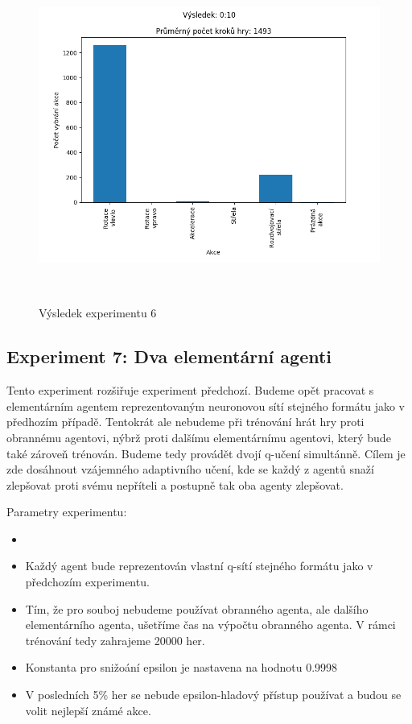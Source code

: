 \begin{figure}[p]\centering
\includegraphics[width=145mm, height=110mm]{./Obrazky/Experiment06Results.png}
\caption{Výsledek experimentu 6}
\label{Výsledek experimentu 06}
\end{figure}
    



\subsection{Experiment 7: Dva elementární agenti}
Tento experiment rozšiřuje experiment předchozí. Budeme opět pracovat s elementárním agentem reprezentovaným neuronovou sítí stejného formátu jako v předhozím případě.
Tentokrát ale nebudeme při trénování hrát hry proti obrannému agentovi, nýbrž proti dalšímu elementárnímu agentovi, který bude také zároveň trénován.
Budeme tedy provádět dvojí q-učení simultánně. Cílem je zde dosáhnout vzájemného adaptivního učení, kde se každý z agentů snaží zlepšovat proti svému nepříteli a postupně tak oba agenty zlepšovat.
\par


Parametry experimentu:
\begin{itemize}
    \item {}
    \item Každý agent bude reprezentován vlastní q-sítí stejného formátu jako v předchozím experimentu.
    \item Tím, že pro souboj nebudeme používat obranného agenta, ale dalšího elementárního agenta, ušetříme čas na výpočtu obranného agenta. V rámci trénování tedy zahrajeme 20000 her.  
    \item Konstanta pro snižoání epsilon je nastavena na hodnotu 0.9998
    \item V posledních 5\% her se nebude epsilon-hladový přístup používat a budou se volit nejlepší známé akce.
\end{itemize}


